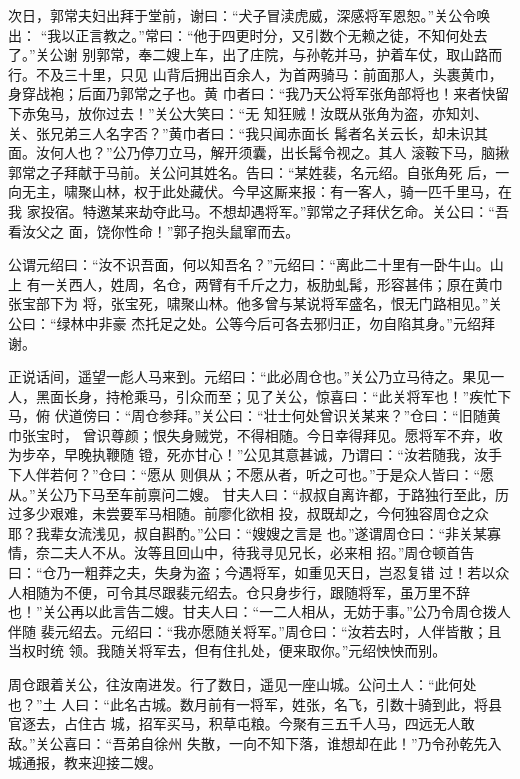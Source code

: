 次日，郭常夫妇出拜于堂前，谢曰：“犬子冒渎虎威，深感将军恩恕。”关公令唤出：
“我以正言教之。”常曰：“他于四更时分，又引数个无赖之徒，不知何处去了。”关公谢
别郭常，奉二嫂上车，出了庄院，与孙乾并马，护着车仗，取山路而行。不及三十里，只见
山背后拥出百余人，为首两骑马：前面那人，头裹黄巾，身穿战袍；后面乃郭常之子也。黄
巾者曰：“我乃天公将军张角部将也！来者快留下赤兔马，放你过去！”关公大笑曰：“无
知狂贼！汝既从张角为盗，亦知刘、关、张兄弟三人名字否？”黄巾者曰：“我只闻赤面长
髯者名关云长，却未识其面。汝何人也？”公乃停刀立马，解开须囊，出长髯令视之。其人
滚鞍下马，脑揪郭常之子拜献于马前。关公问其姓名。告曰：“某姓裴，名元绍。自张角死
后，一向无主，啸聚山林，权于此处藏伏。今早这厮来报：有一客人，骑一匹千里马，在我
家投宿。特邀某来劫夺此马。不想却遇将军。”郭常之子拜伏乞命。关公曰：“吾看汝父之
面，饶你性命！”郭子抱头鼠窜而去。

公谓元绍曰：“汝不识吾面，何以知吾名？”元绍曰：“离此二十里有一卧牛山。山上
有一关西人，姓周，名仓，两臂有千斤之力，板肋虬髯，形容甚伟；原在黄巾张宝部下为
将，张宝死，啸聚山林。他多曾与某说将军盛名，恨无门路相见。”关公曰：“绿林中非豪
杰托足之处。公等今后可各去邪归正，勿自陷其身。”元绍拜谢。

正说话间，遥望一彪人马来到。元绍曰：“此必周仓也。”关公乃立马待之。果见一
人，黑面长身，持枪乘马，引众而至；见了关公，惊喜曰：“此关将军也！”疾忙下马，俯
伏道傍曰：“周仓参拜。”关公曰：“壮士何处曾识关某来？”仓曰：“旧随黄巾张宝时，
曾识尊颜；恨失身贼党，不得相随。今日幸得拜见。愿将军不弃，收为步卒，早晚执鞭随
镫，死亦甘心！”公见其意甚诚，乃谓曰：“汝若随我，汝手下人伴若何？”仓曰：“愿从
则俱从；不愿从者，听之可也。”于是众人皆曰：“愿从。”关公乃下马至车前禀问二嫂。
甘夫人曰：“叔叔自离许都，于路独行至此，历过多少艰难，未尝要军马相随。前廖化欲相
投，叔既却之，今何独容周仓之众耶？我辈女流浅见，叔自斟酌。”公曰：“嫂嫂之言是
也。”遂谓周仓曰：“非关某寡情，奈二夫人不从。汝等且回山中，待我寻见兄长，必来相
招。”周仓顿首告曰：“仓乃一粗莽之夫，失身为盗；今遇将军，如重见天日，岂忍复错
过！若以众人相随为不便，可令其尽跟裴元绍去。仓只身步行，跟随将军，虽万里不辞
也！”关公再以此言告二嫂。甘夫人曰：“一二人相从，无妨于事。”公乃令周仓拨人伴随
裴元绍去。元绍曰：“我亦愿随关将军。”周仓曰：“汝若去时，人伴皆散；且当权时统
领。我随关将军去，但有住扎处，便来取你。”元绍怏怏而别。

周仓跟着关公，往汝南进发。行了数日，遥见一座山城。公问土人：“此何处也？”土
人曰：“此名古城。数月前有一将军，姓张，名飞，引数十骑到此，将县官逐去，占住古
城，招军买马，积草屯粮。今聚有三五千人马，四远无人敢敌。”关公喜曰：“吾弟自徐州
失散，一向不知下落，谁想却在此！”乃令孙乾先入城通报，教来迎接二嫂。

